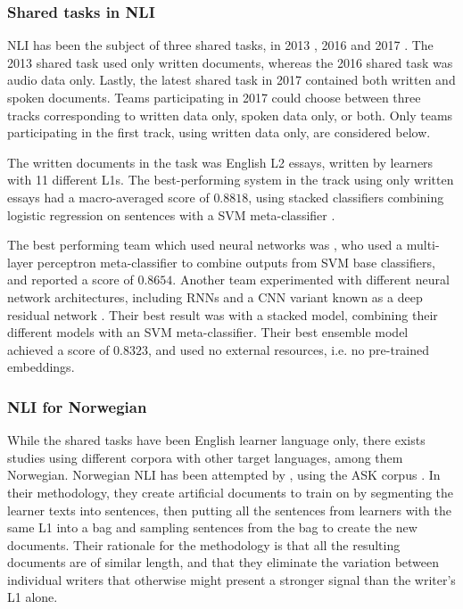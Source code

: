 \subsubsection{Shared tasks in NLI}

\ac{NLI} has been the subject of three shared tasks, in 2013
\autocite{tetreault2013report}, 2016 \autocite{schuller2016interspeech} and
2017 \autocite{nli17}. The 2013 shared task used only written documents,
whereas the 2016 shared task was audio data only. Lastly, the latest shared
task in 2017 contained both written and spoken documents. Teams participating
in 2017 could choose between three tracks corresponding to written data only,
spoken data only, or both. Only teams participating in the first track, using
written data only, are considered below.

The written documents in the task was English L2 essays, written by learners
with 11 different L1s. The best-performing system in the track using only
written essays had a macro-averaged \FI score of $0.8818$, using stacked
classifiers combining logistic regression on sentences with a \ac{SVM}
meta-classifier \autocite{cimino17}.

The best performing team which used neural networks was \textcite{li17}, who
used a multi-layer perceptron meta-classifier to combine outputs from
\ac{SVM} base classifiers, and reported a \FI score of $0.8654$. Another team
experimented with different neural network architectures, including \acp{RNN}
and a \ac{CNN} variant known as a deep residual network
\autocite{bjerva2017neural}. Their best result was with a stacked model,
combining their different models with an \ac{SVM} meta-classifier. Their best
ensemble model achieved a \FI score of $0.8323$, and used no external
resources, i.e. no pre-trained embeddings.


\subsubsection{NLI for Norwegian}

While the shared tasks have been English learner language only, there exists
studies using different corpora with other target languages, among them
Norwegian. Norwegian \ac{NLI} has been attempted by \textcite{malmasi15},
using the ASK corpus \autocite{tenfjord06}. In their methodology, they create
artificial documents to train on by segmenting the learner texts into
sentences, then putting all the sentences from learners with the same L1 into
a bag and sampling sentences from the bag to create the new documents. Their
rationale for the methodology is that all the resulting documents are of
similar length, and that they eliminate the variation between individual
writers that otherwise might present a stronger signal than the writer's L1
alone.

